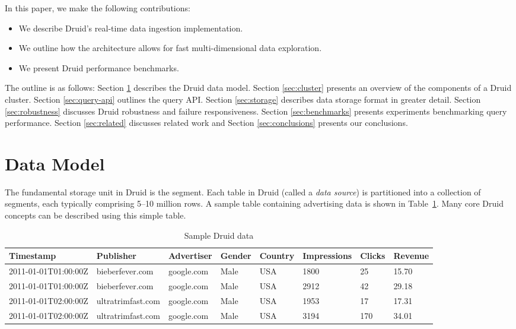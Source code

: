 \documentclass{vldb}
\begin{document}
In this paper, we make the following contributions:
\begin{itemize}
\item We describe Druid’s real-time data ingestion implementation.
\item We outline how the architecture allows for fast multi-dimensional data exploration.
\item We present Druid performance benchmarks.
\end{itemize} 

The outline is as follows: Section \ref{sec:data-model} describes the Druid data model. Section \ref{sec:cluster} presents an overview of the components of a Druid cluster. Section \ref{sec:query-api} outlines the query API. Section \ref{sec:storage} describes data storage format in greater detail. Section \ref{sec:robustness} discusses Druid robustness and failure responsiveness. Section \ref{sec:benchmarks} presents experiments benchmarking query performance. Section \ref{sec:related} discusses related work and Section \ref{sec:conclusions} presents our conclusions.

\section{Data Model}
\label{sec:data-model}
The fundamental storage unit in Druid is the segment. Each table in Druid (called a \emph{data source})
is partitioned into a collection of segments, each typically comprising 5--10 million rows. A sample table 
containing advertising data is shown in Table~\ref{tab:sample_data}. Many core Druid concepts can be described
using this simple table.

\begin{table}
  \centering
  \caption{Sample Druid data}
  \label{tab:sample_data}
  \begin{tabular}{| l | l | l | l | l | l | l | l |}
    \hline
    \textbf{Timestamp} & \textbf{Publisher} & \textbf{Advertiser} & \textbf{Gender} & \textbf{Country} & \textbf{Impressions} & \textbf{Clicks} & \textbf{Revenue} \\ \hline
    2011-01-01T01:00:00Z & bieberfever.com & google.com & Male & USA & 1800 & 25 & 15.70 \\ \hline
    2011-01-01T01:00:00Z & bieberfever.com & google.com & Male & USA & 2912 & 42 & 29.18 \\ \hline
    2011-01-01T02:00:00Z & ultratrimfast.com & google.com & Male & USA & 1953 & 17 & 17.31 \\ \hline
    2011-01-01T02:00:00Z & ultratrimfast.com & google.com & Male & USA & 3194 & 170 & 34.01 \\ \hline
  \end{tabular}
\end{table}
\end{document}
